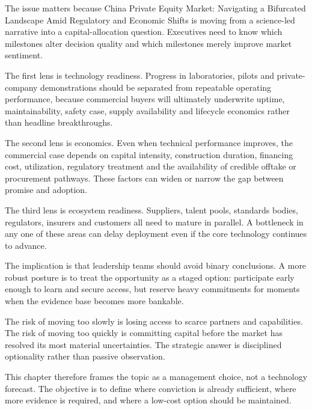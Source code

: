 \documentclass[10pt,a4paper]{article}
\begin{document}
{\small The issue matters because China Private Equity Market: Navigating a Bifurcated Landscape Amid Regulatory and Economic Shifts is moving from a science-led narrative into a capital-allocation question. Executives need to know which milestones alter decision quality and which milestones merely improve market sentiment.}\par
{\small The first lens is technology readiness. Progress in laboratories, pilots and private-company demonstrations should be separated from repeatable operating performance, because commercial buyers will ultimately underwrite uptime, maintainability, safety case, supply availability and lifecycle economics rather than headline breakthroughs.}\par
{\small The second lens is economics. Even when technical performance improves, the commercial case depends on capital intensity, construction duration, financing cost, utilization, regulatory treatment and the availability of credible offtake or procurement pathways. These factors can widen or narrow the gap between promise and adoption.}\par
{\small The third lens is ecosystem readiness. Suppliers, talent pools, standards bodies, regulators, insurers and customers all need to mature in parallel. A bottleneck in any one of these areas can delay deployment even if the core technology continues to advance.}\par
{\small The implication is that leadership teams should avoid binary conclusions. A more robust posture is to treat the opportunity as a staged option: participate early enough to learn and secure access, but reserve heavy commitments for moments when the evidence base becomes more bankable.}\par
{\small The risk of moving too slowly is losing access to scarce partners and capabilities. The risk of moving too quickly is committing capital before the market has resolved its most material uncertainties. The strategic answer is disciplined optionality rather than passive observation.}\par
{\small This chapter therefore frames the topic as a management choice, not a technology forecast. The objective is to define where conviction is already sufficient, where more evidence is required, and where a low-cost option should be maintained.}\par
\label{chap:1:end}
\end{document}
